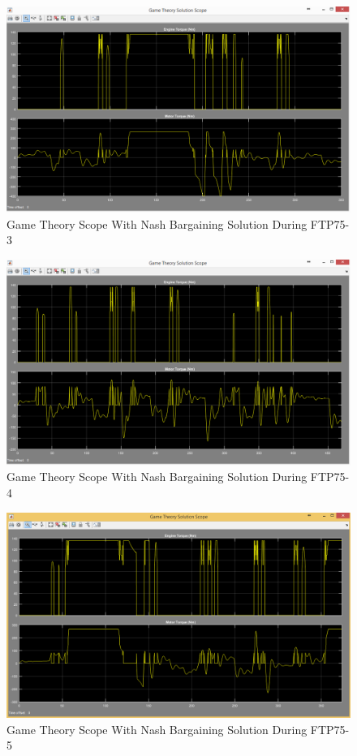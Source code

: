 \begin{figure}[h]
\centering
\includegraphics[scale=0.47]{figures/NashSolution/FTP75-3/gameTheory20Juni}
\caption{Game Theory Scope With Nash Bargaining Solution During FTP75-3}
\label{fig:gtns3}
\end{figure}

\begin{figure}[h]
\centering
\includegraphics[scale=0.47]{figures/NashSolution/FTP75-4/gameTheory21Juni}
\caption{Game Theory Scope With Nash Bargaining Solution During FTP75-4}
\label{fig:gtns4}
\end{figure}

\begin{figure}[h]
\centering
\includegraphics[scale=0.47]{figures/NashSolution/FTP75-5/gameTheory22Juni}
\caption{Game Theory Scope With Nash Bargaining Solution During FTP75-5}
\label{fig:gtns5}
\end{figure}


